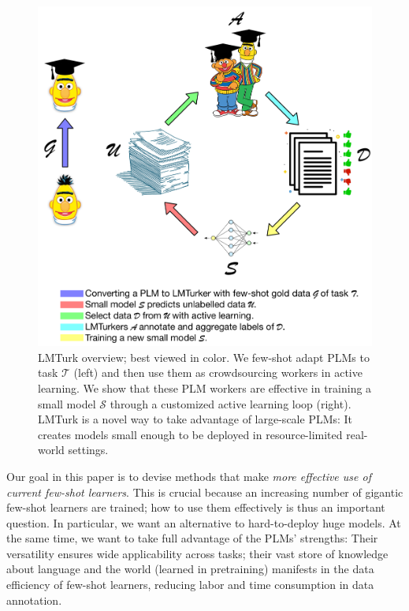 \documentclass[11pt]{article}
\def\md{LMTurk\xspace}
\def\figlabel#1{\label{fig:#1}\label{p:#1}}
\begin{document}
\begin{figure}[t]
\centering
\includegraphics[width=\linewidth]{imgs/overallframework.pdf}
\caption{
  \md overview; best viewed in color.
  We few-shot adapt PLMs to task $\mathcal{T}$ (left) and
  then use them as crowdsourcing workers in active learning.
  We show that these PLM workers are effective in training a small model
{\cal $\mathcal{S}$} through a customized active learning loop (right).
\md is a novel way to take advantage of large-scale PLMs:
It creates models small enough to be deployed in resource-limited
real-world settings.}
\figlabel{overallframe}
\end{figure}


Our goal in this paper is to devise
methods that make
\emph{more effective use of
  current few-shot learners}.
This is crucial because
an increasing number of
gigantic few-shot learners are trained;
how to use them effectively is thus
an important question.
In particular,
we want an alternative to
hard-to-deploy huge models.
At the same time, we want to take full advantage of the PLMs'
strengths:
Their versatility
ensures 
wide applicability across tasks;
their vast store of knowledge
about language and the world
(learned in pretraining)
manifests in the
data efficiency of
few-shot learners, reducing
labor and time consumption
in data annotation.
\end{document}
